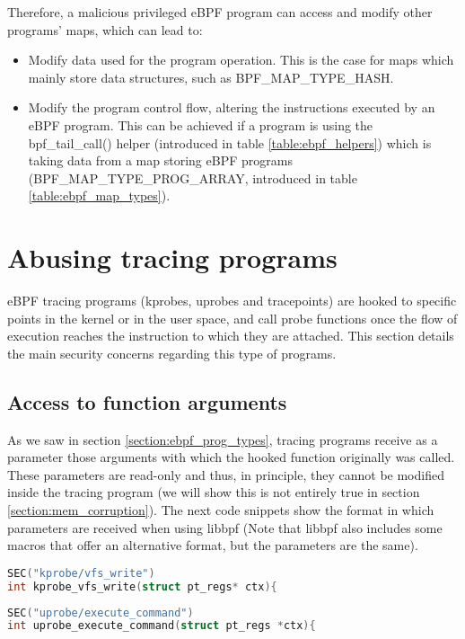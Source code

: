 Therefore, a malicious privileged eBPF program can access and modify other programs' maps, which can lead to:
\begin{itemize}
\item Modify data used for the program operation. This is the case for maps which mainly store data structures, such as BPF\_MAP\_TYPE\_HASH.
\item Modify the program control flow, altering the instructions executed by an eBPF program. This can be achieved if a program is using the bpf\_tail\_call() helper (introduced in table \ref{table:ebpf_helpers}) which is taking data from a map storing eBPF programs (BPF\_MAP\_TYPE\_PROG\_ARRAY, introduced in table \ref{table:ebpf_map_types}).
\end{itemize}


\section{Abusing tracing programs}
eBPF tracing programs (kprobes, uprobes and tracepoints) are hooked to specific points in the kernel or in the user space, and call probe functions once the flow of execution reaches the instruction to which they are attached. This section details the main security concerns regarding this type of programs.

\subsection{Access to function arguments} \label{subsection:tracing_arguments}
As we saw in section \ref{section:ebpf_prog_types}, tracing programs receive as a parameter those arguments with which the hooked function originally was called. These parameters are read-only and thus, in principle, they cannot be modified inside the tracing program (we will show this is not entirely true in section \ref{section:mem_corruption}). The next code snippets show the format in which parameters are received when using libbpf (Note that libbpf also includes  some macros that offer an alternative format, but the parameters are the same).

\begin{lstlisting}[language=C, caption={Probe function for a kprobe on the kernel function vfs\_write.}, label={code:format_kprobe}]
SEC("kprobe/vfs_write")
int kprobe_vfs_write(struct pt_regs* ctx){
\end{lstlisting}

\begin{lstlisting}[language=C, caption={Probe function for an uprobe, execute\_command is defined from user space.}, label={code:format_uprobe}]
SEC("uprobe/execute_command")
int uprobe_execute_command(struct pt_regs *ctx){
\end{lstlisting}

